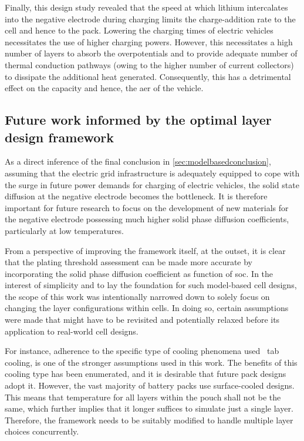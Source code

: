 Finally, this design study revealed that the speed at which lithium intercalates
into the negative  electrode during charging limits the  charge-addition rate to
the cell and hence to the pack. Lowering the charging times of electric vehicles
necessitates the  use of  higher charging powers.  However, this  necessitates a
high  number of  layers to  absorb the  overpotentials and  to provide  adequate
number of  thermal conduction pathways  (owing to  the higher number  of current
collectors) to dissipate the additional heat generated. Consequently, this has a
detrimental effect on the capacity and hence, the \gls{aer} of the vehicle.

\subsection{Future work informed by  the optimal layer design framework}

As     a     direct     inference     of     the     final     conclusion     in
\cref{sec:modelbasedconclusion}, assuming that  the electric grid infrastructure
is  adequately equipped  to cope  with  the surge  in future  power demands  for
charging  of  electric vehicles,  the  solid  state  diffusion at  the  negative
electrode becomes the bottleneck. It  is therefore important for future research
to  focus  on the  development  of  new  materials  for the  negative  electrode
possessing much higher  solid phase diffusion coefficients,  particularly at low
temperatures.

From a perspective of improving the framework itself, at the outset, it is clear
that the plating threshold assessment can be made more accurate by incorporating
the solid phase diffusion coefficient as  function of \gls{soc}. In the interest
of simplicity and  to lay the foundation for such  model-based cell designs, the
scope of this  work was intentionally narrowed down to  solely focus on changing
the layer  configurations within  cells. In doing  so, certain  assumptions were
made  that  might have  to  be  revisited  and  potentially relaxed  before  its
application to real-world cell designs.

For instance, adherence to the specific type of cooling phenomena used \ie~tab
cooling, is one of  the stronger assumptions used in this  work. The benefits of
this cooling  type has  been enumerated,  and it is  desirable that  future pack
designs adopt it. However, the vast majority of battery packs use surface-cooled
designs. This means  that temperature for all layers within  the pouch shall not
be the same,  which further implies that  it longer suffices to  simulate just a
single layer. Therefore,  the framework needs to be suitably  modified to handle
multiple layer choices concurrently.

